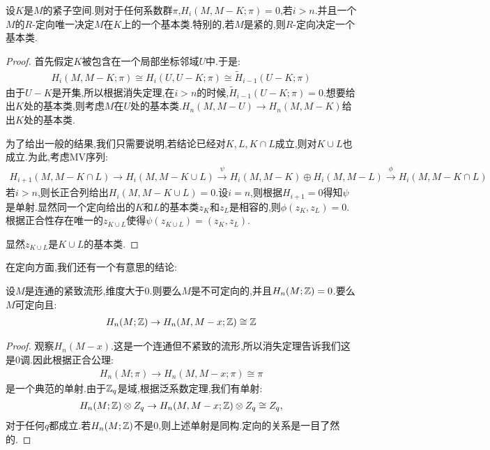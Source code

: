 \begin{theorem}
    设$K$是$M$的紧子空间.则对于任何系数群$\pi$,$H_i(M,M-K;\pi)=0$,若$i>n$.并且一个$M$的$R$-定向唯一决定$M$在$K$上的一个基本类.特别的,若$M$是紧的,则$R$-定向决定一个基本类.
\end{theorem}
\begin{proof}
    首先假定$K$被包含在一个局部坐标邻域$U$中.于是:
    \begin{align*}
        H_i(M,M-K;\pi)\cong H_i(U,U-K;\pi) \cong \tilde{H}_{i-1}(U-K;\pi)
    \end{align*}
    由于$U-K$是开集,所以根据消失定理,在$i>n$的时候,$\tilde{H}_{i-1}(U-K;\pi)=0$.想要给出$K$处的基本类,则考虑$M$在$U$处的基本类.$H_n(M,M-U) \to H_n(M,M-K)$给出$K$处的基本类.

    为了给出一般的结果,我们只需要说明,若结论已经对$K,L,K\cap L$成立,则对$K\cup L$也成立.为此,考虑MV序列:
    \begin{align*}
        H_{i+1}(M,M-K\cap L) \to H_i(M,M-K\cup L) \stackrel{\psi}{\rightarrow} H_i(M,M-K)\oplus H_i(M,M-L) \stackrel{\phi}{\rightarrow} H_i(M,M-K\cap L)
    \end{align*}
    若$i>n$,则长正合列给出$H_i(M,M-K\cup L)=0$.设$i=n$,则根据$H_{i+1}=0$得知$\psi$是单射.显然同一个定向给出的$K$和$L$的基本类$z_K$和$z_L$是相容的,则$\phi(z_K,z_L)=0$.根据正合性存在唯一的$z_{K\cup L}$使得$\psi(z_{K\cup L})=(z_K,z_L)$.

    显然$z_{K \cup L}$是$K\cup L$的基本类.
\end{proof}

在定向方面,我们还有一个有意思的结论:
\begin{corollary}
    设$M$是连通的紧致流形,维度大于$0$.则要么$M$是不可定向的,并且$H_n(M;\mathbb{Z})=0$.要么$M$可定向且:
    \begin{align*}
        H_n(M;\mathbb{Z}) \rightarrow H_n(M,M-x;\mathbb{Z})\cong \mathbb{Z}
    \end{align*}
\end{corollary}
\begin{proof}
    观察$H_n(M-x)$.这是一个连通但不紧致的流形,所以消失定理告诉我们这是0调.因此根据正合公理:
    \begin{align*}
        H_n(M;\pi) \rightarrow H_n(M,M-x;\pi)\cong \pi
    \end{align*}
    是一个典范的单射.由于$\mathbb{Z}_q$是域,根据泛系数定理,我们有单射:
    \begin{align*}
        H_n(M;\mathbb{Z})\otimes Z_q \to H_n(M,M-x;\mathbb{Z})\otimes Z_q \cong Z_q,
    \end{align*}
    对于任何$q$都成立.若$H_n(M;\mathbb{Z})$不是$0$,则上述单射是同构.定向的关系是一目了然的.
\end{proof}
